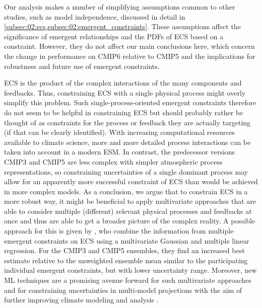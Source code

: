 Our analysis makes a number of simplifying assumptions common to other studies,
such as model independence, discussed in detail in
\cref{subsec:02:ecs,subsec:02:emergent_constraints}. These assumptions affect
the significance of emergent relationships and the \acp{PDF} of \ac{ECS} based
on a constraint. However, they do not affect our main conclusions here, which
concern the change in performance on \acs{CMIP}6 relative to \acs{CMIP}5 and
the implications for robustness and future use of emergent constraints.

\ac{ECS} is the product of the complex interactions of the many components and
feedbacks. Thus, constraining \ac{ECS} with a single physical process might
overly simplify this problem. Such single-process-oriented emergent constraints
therefore do not seem to be helpful in constraining \ac{ECS} but should
probably rather be thought of as constraints for the process or feedback they
are actually targeting (if that can be clearly identified). With increasing
computational resources available to climate science, more and more detailed
process interactions can be taken into account in a modern \ac{ESM}. In
contrast, the predecessor versions \acs{CMIP}3 and \acs{CMIP}5 are less complex
with simpler atmospheric process representations, so constraining uncertainties
of a single dominant process may allow for an apparently more successful
constraint of \ac{ECS} than would be achieved in more complex models. As a
conclusion, we argue that to constrain \ac{ECS} in a more robust way, it might
be beneficial to apply multivariate approaches that are able to consider
multiple (different) relevant physical processes and feedbacks at once and thus
are able to get a broader picture of the complex reality. A possible approach
for this is given by \textcite{Bretherton2020}, who combine the information
from multiple emergent constraints on \ac{ECS} using a multivariate Gaussian
and multiple linear regression. For the \acs{CMIP}3 and \acs{CMIP}5 ensembles,
they find an increased best estimate relative to the unweighted ensemble mean
similar to the participating individual emergent constraints, but with lower
uncertainty range. Moreover, new \ac{ML} techniques are a promising avenue
forward for such multivariate approaches and for constraining uncertainties in
multi-model projections 
with the aim of further improving climate modeling and analysis
\autocite{Reichstein2019}.
